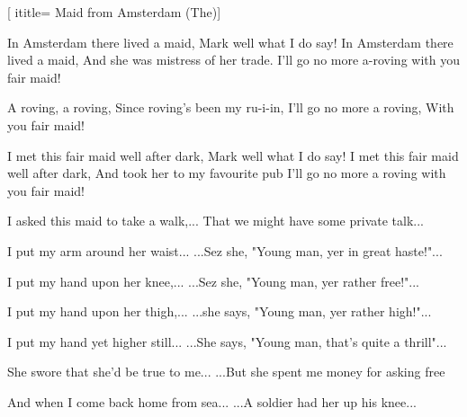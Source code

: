  [
ititle= {Maid from Amsterdam (The)}]

\beginverse
In Amsterdam there lived a maid,
Mark well what I do say!
In Amsterdam there lived a maid,
And she was mistress of her trade.
I'll go no more a-roving with you fair maid!
\endverse

\beginchorus
A roving, a roving,
Since roving's been my ru-i-in,
I'll go no more a roving,
With you fair maid!
\endchorus

\beginverse
I met this fair maid well after dark,
Mark well what I do say!
I met this fair maid well after dark,
And took her to my favourite pub
I'll go no more a roving with you fair maid!
\endverse

\beginverse
I asked this maid to take a walk,...
That we might have some private talk...
\endverse

\beginverse
I put my arm around her waist...
...Sez she, "Young man, yer in great haste!"...
\endverse

\beginverse
I put my hand upon her knee,...
...Sez she, "Young man, yer rather free!"...
\endverse

\beginverse
I put my hand upon her thigh,...
...she says, "Young man, yer rather high!"...
\endverse

\beginverse
I put my hand yet higher still...
...She says, "Young man, that's quite a thrill"...
\endverse

\beginverse
She swore that she'd be true to me...
...But she spent me money for asking free
\endverse

\beginverse
And when I come back home from sea...
...A soldier had her up his knee...
\endverse

\endsong